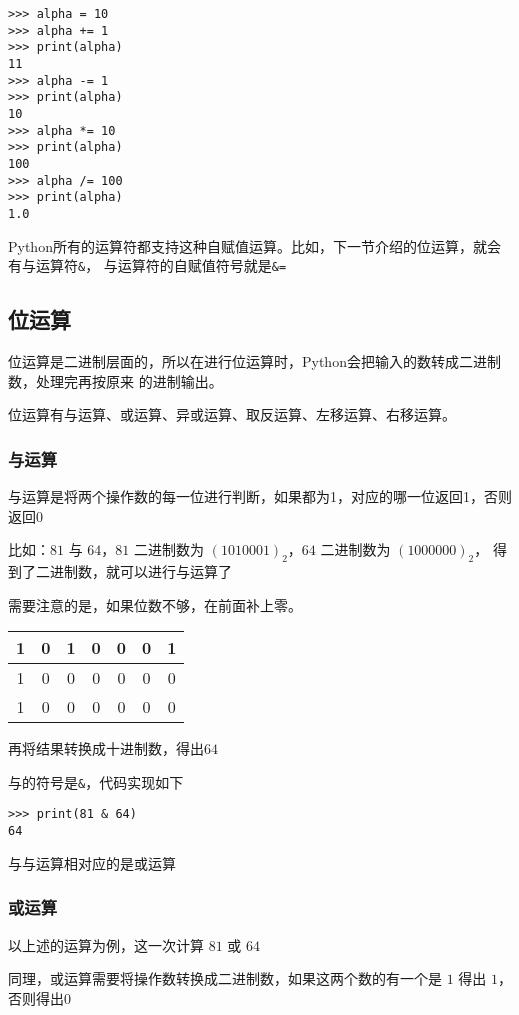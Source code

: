 \documentclass{book}
\begin{document}
\begin{verbatim}
>>> alpha = 10
>>> alpha += 1
>>> print(alpha)
11
>>> alpha -= 1
>>> print(alpha)
10
>>> alpha *= 10
>>> print(alpha)
100
>>> alpha /= 100
>>> print(alpha)
1.0
\end{verbatim}
Python所有的运算符都支持这种自赋值运算。比如，下一节介绍的位运算，就会有与运算符\verb|&|，
与运算符的自赋值符号就是\verb|&=|
\subsection{位运算}
\indent 位运算是二进制层面的，所以在进行位运算时，Python会把输入的数转成二进制数，处理完再按原来
的进制输出。


位运算有与运算、或运算、异或运算、取反运算、左移运算、右移运算。


\subsubsection{与运算}

与运算是将两个操作数的每一位进行判断，如果都为1，对应的哪一位返回1，否则返回0


比如：$81$ 与 $64$，$81$ 二进制数为 $(1010001)_2$，$64$ 二进制数为 $(1000000)_2$，
得到了二进制数，就可以进行与运算了


需要注意的是，如果位数不够，在前面补上零。\\



\begin{tabular}{|c|c|c|c|c|c|c|}
\hline
1 & 0 & 1 & 0 & 0 & 0 & 1\\\hline
1 & 0 & 0 & 0 & 0 & 0 & 0\\\hline
1 & 0 & 0 & 0 & 0 & 0 & 0\\\hline
\end{tabular}


再将结果转换成十进制数，得出$64$


与的符号是\verb|&|，代码实现如下


\begin{verbatim}
>>> print(81 & 64)
64
\end{verbatim}

与与运算相对应的是或运算

\subsubsection{或运算}
\indent 以上述的运算为例，这一次计算 $81$ 或 $64$


同理，或运算需要将操作数转换成二进制数，如果这两个数的有一个是 $1$ 得出 $1$，否则得出$0$
\end{document}
